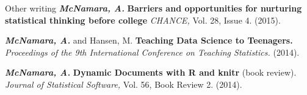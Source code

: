 \documentclass{resume} %
\begin{document}

\begin{rSection}{Other writing}
{\bf \em McNamara, A.} {\bf Barriers and opportunities for nurturing statistical thinking before college}{ \em CHANCE,} Vol. 28, Issue 4. (2015).

{\bf \em McNamara, A. }and Hansen, M. {\bf Teaching Data Science to Teenagers.}{ \em Proceedings of the 9th International Conference on Teaching Statistics.} (2014). 

{\bf \em McNamara, A. }{\bf Dynamic Documents with R and knitr} (book review). {\em Journal of Statistical Software,}{ Vol. 56, Book Review 2.} (2014).
\end{rSection}

\end{document}
